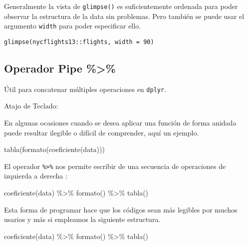 \documentclass[
]{book}
\newenvironment{Shaded}{\begin{snugshade}}{\end{snugshade}}
\newcommand{\FunctionTok}[1]{\textcolor[rgb]{0.00,0.00,0.00}{#1}}
\newcommand{\NormalTok}[1]{#1}
\newcommand{\SpecialCharTok}[1]{\textcolor[rgb]{0.00,0.00,0.00}{#1}}
\begin{document}
Generalmente la vista de \texttt{glimpse()} es suficientemente ordenada para poder observar la estructura de la data sin problemas. Pero también se puede usar el argumento \texttt{width} para poder especificar ello.

\begin{verbatim}
glimpse(nycflights13::flights, width = 90)
\end{verbatim}

\hypertarget{operador-pipe}{%
\subsection{Operador Pipe \%\textgreater\%}\label{operador-pipe}}

Útil para concatenar múltiples operaciones en \texttt{dplyr}.

Atajo de Teclado:

En algunas ocasiones cuando se desea aplicar una función de forma anidada puede resultar ilegible o difícil de comprender, aquí un ejemplo.

\begin{Shaded}
\begin{Highlighting}[]
\FunctionTok{tabla}\NormalTok{(}\FunctionTok{formato}\NormalTok{(}\FunctionTok{coeficiente}\NormalTok{(data)))}
\end{Highlighting}
\end{Shaded}

El operador \texttt{\%\textgreater{}\%} nos permite escribir de una secuencia de operaciones de izquierda a derecha :

\begin{Shaded}
\begin{Highlighting}[]
\FunctionTok{coeficiente}\NormalTok{(data) }\SpecialCharTok{\%\textgreater{}\%} \FunctionTok{formato}\NormalTok{() }\SpecialCharTok{\%\textgreater{}\%} \FunctionTok{tabla}\NormalTok{()}
\end{Highlighting}
\end{Shaded}

Esta forma de programar hace que los códigos sean más legibles por muchos usarios y más si
empleamos la siguiente estructura.

\begin{Shaded}
\begin{Highlighting}[]
\FunctionTok{coeficiente}\NormalTok{(data) }\SpecialCharTok{\%\textgreater{}\%} 
  \FunctionTok{formato}\NormalTok{() }\SpecialCharTok{\%\textgreater{}\%} 
  \FunctionTok{tabla}\NormalTok{()}
\end{Highlighting}
\end{Shaded}
\end{document}
